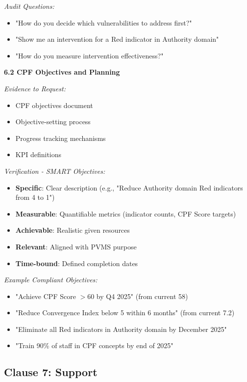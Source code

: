 \documentclass[11pt,a4paper]{article}
\begin{document}
\textit{Audit Questions:}
\begin{itemize}
\item "How do you decide which vulnerabilities to address first?"
\item "Show me an intervention for a Red indicator in Authority domain"
\item "How do you measure intervention effectiveness?"
\end{itemize}

\textbf{6.2 CPF Objectives and Planning}

\textit{Evidence to Request:}
\begin{itemize}
\item CPF objectives document
\item Objective-setting process
\item Progress tracking mechanisms
\item KPI definitions
\end{itemize}

\textit{Verification - SMART Objectives:}
\begin{itemize}
\item \textbf{Specific}: Clear description (e.g., "Reduce Authority domain Red indicators from 4 to 1")
\item \textbf{Measurable}: Quantifiable metrics (indicator counts, CPF Score targets)
\item \textbf{Achievable}: Realistic given resources
\item \textbf{Relevant}: Aligned with PVMS purpose
\item \textbf{Time-bound}: Defined completion dates
\end{itemize}

\textit{Example Compliant Objectives:}
\begin{itemize}
\item "Achieve CPF Score $>$60 by Q4 2025" (from current 58)
\item "Reduce Convergence Index below 5 within 6 months" (from current 7.2)
\item "Eliminate all Red indicators in Authority domain by December 2025"
\item "Train 90\% of staff in CPF concepts by end of 2025"
\end{itemize}

\subsection{Clause 7: Support}
\end{document}

